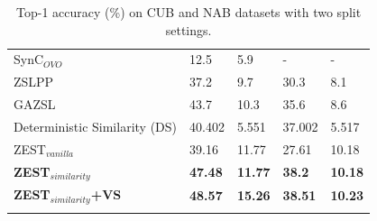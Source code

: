 \documentclass[11pt,a4paper]{article}
\begin{document}
\begin{table}[t]
{\begin{tabular}{l|ll|ll}
SynC$_{OVO}$ \citet{changpinyo2016synthesized}      & 12.5                              & 5.9                                & -                                 & -                                  \\
ZSLPP \citet{elhoseiny2017link}                   & 37.2                              & 9.7                                & 30.3                              & 8.1                                \\
GAZSL \citet{zhu2018generative}                   & 43.7                              & 10.3                               & 35.6                              & 8.6                                \\ 
\hline
Deterministic Similarity (DS) & 40.402                            & 5.551                              & 37.002                            & 5.517                              \\
ZEST$_{vanilla}$                                                                 & 39.16                            & 11.77                             & 27.61                            & 10.18                             \\
\textbf{ZEST$_{similarity}$}                                           & \textbf{47.48}                   & \textbf{11.77}                     & \textbf{38.2}                   & \textbf{10.18}                    \\
\hline
\textbf{ZEST$_{similarity}$+VS}                                        & \textbf{48.57}                    & \textbf{15.26}                    & \textbf{38.51 }                   & \textbf{10.23 }                    \\ 
\Xhline{6\arrayrulewidth}
                 
\end{tabular}
}
\caption{Top-1 accuracy (\%) on CUB and NAB datasets with two split settings.}
\label{tab:results}
\end{table}
\end{document}

